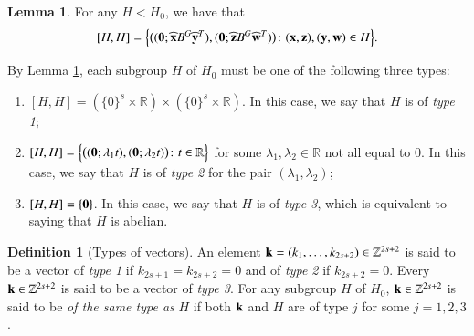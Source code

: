 \documentclass[12pt,amstex]{amsart}
\theoremstyle{definition}
\newtheorem{lem}[thm]{Lemma}
\newtheorem{defn}[thm]{Definition}
\def \k {\bold{k}}
\begin{document}
\begin{lem}\label{dege}
  For any $H<H_{0}$, we have that
\begin{equation}\nonumber
    \begin{split}
      [H,H]=\Bigl\{\bigl((\bold{0};\widehat{\bold{x}}B^{G}\widehat{\bold{y}}^{T}),(\bold{0};\widehat{\bold{z}}B^{G}\widehat{\bold{w}}^{T})\bigl)\colon (\bold{x},\bold{z}),
  (\bold{y},\bold{w})\in H\Bigr\}.
    \end{split}
  \end{equation}
\end{lem}

By Lemma \ref{dege}, each subgroup $H$ of $H_{0}$ must be one of the following three types:
\begin{enumerate}
    \item $[H,H]=(\{0\}^{s}\times\mathbb{R})\times(\{0\}^{s}\times\mathbb{R})$. In this case, we say that $H$ is of \emph{type 1};
    \item $[H,H]=\Bigl\{\bigl((\bold{0};\lambda_{1}t),(\bold{0};\lambda_{2}t)\bigr)\colon t\in\mathbb{R}\Bigr\}$ for some $\lambda_{1},\lambda_{2}\in\mathbb{R}$
        not all equal to 0. In this case, we say that $H$ is of \emph{type 2} for the pair $(\lambda_{1},\lambda_{2})$;
     \item $[H,H]=\{\bold{0}\}$. In this case, we say that $H$ is of \emph{type 3}, which is equivalent to saying that $H$ is abelian.
   \end{enumerate}

\begin{defn}[Types of vectors]
 An element $\k=(k_{1},\dots,k_{2s+2})\in\mathbb{Z}^{2s+2}$ is said to be a vector of \emph{type 1} if $k_{2s+1}=k_{2s+2}=0$ and of \emph{type 2} if $k_{2s+2}=0$. Every
$\k\in\mathbb{Z}^{2s+2}$ is said to be a vector of \emph{type 3}. For any subgroup $H$ of $H_{0}$, $\k\in\mathbb{Z}^{2s+2}$ is said to be \emph{of the same type as} $H$
if both $\k$ and $H$ are of type $j$ for some $j=1,2,3$.
\end{defn}
\end{document}
